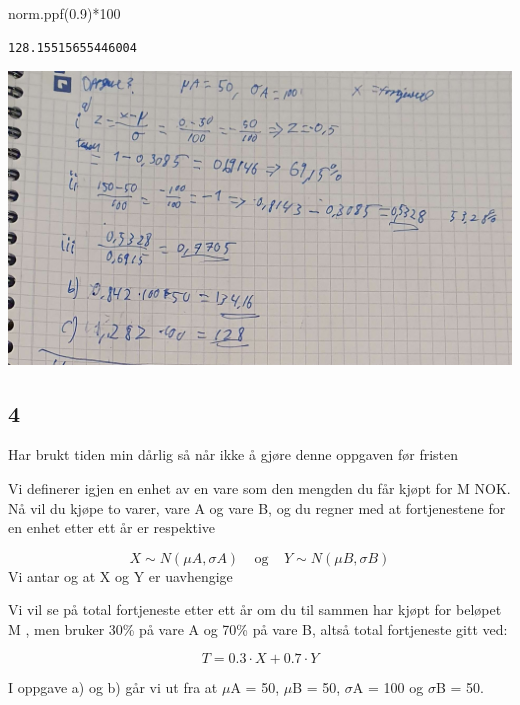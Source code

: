 \documentclass[
  12pt,
  a4paper,
  DIV=11,
  numbers=noendperiod]{scrartcl}
\newenvironment{Shaded}{\begin{snugshade}}{\end{snugshade}}
\newcommand{\DecValTok}[1]{\textcolor[rgb]{0.68,0.00,0.00}{#1}}
\newcommand{\FloatTok}[1]{\textcolor[rgb]{0.68,0.00,0.00}{#1}}
\newcommand{\NormalTok}[1]{\textcolor[rgb]{0.00,0.23,0.31}{#1}}
\newcommand{\OperatorTok}[1]{\textcolor[rgb]{0.37,0.37,0.37}{#1}}
\begin{document}
\begin{Shaded}
\begin{Highlighting}[]
\NormalTok{norm.ppf(}\FloatTok{0.9}\NormalTok{)}\OperatorTok{*}\DecValTok{100}
\end{Highlighting}
\end{Shaded}

\begin{verbatim}
128.15515655446004
\end{verbatim}

\clearpage

\includegraphics{oblig2_utregning/oppgave3.jpg}

\clearpage

\subsection{4}\label{section-3}

Har brukt tiden min dårlig så når ikke å gjøre denne oppgaven før
fristen

Vi definerer igjen en enhet av en vare som den mengden du får kjøpt for
M NOK. Nå vil du kjøpe to varer, vare A og vare B, og du regner med at
fortjenestene for en enhet etter ett år er respektive

\[ 
X ∼ N(\mu A, \sigma A) \> \> \> \> \> \text{og} \> \> \> \> \> Y ∼ N(\mu B , \sigma B )
\] Vi antar og at X og Y er uavhengige

Vi vil se på total fortjeneste etter ett år om du til sammen har kjøpt
for beløpet M , men bruker 30\% på vare A og 70\% på vare B, altså total
fortjeneste gitt ved:

\[
T = 0.3 · X + 0.7 · Y
\]

I oppgave a) og b) går vi ut fra at \(\mu\)A = 50, \(\mu\)B = 50,
\(\sigma\)A = 100 og \(\sigma\)B = 50.
\end{document}
